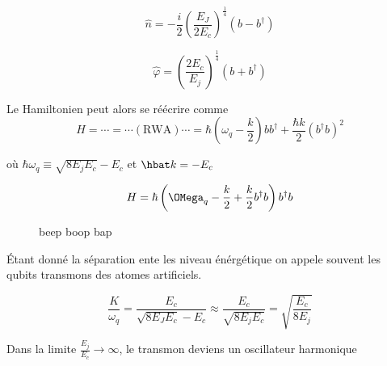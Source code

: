\[ \hat n = - \frac{i}{2} \left( \frac{E_J}{2E_c}  \right)^{\frac{1}{4} } \left( b - b ^{\dagger} \right) \]


\[ \hat \varphi = \left( \frac{2E_c}{E_j}  \right)^{\frac{1}{4} }\left( b + b ^{\dagger} \right)  \]


Le Hamiltonien peut alors se réécrire comme \[ H = \dotsb = \dotsb(\text{RWA} ) \dotsb = \hbar \left( \omega_q - \frac{k}{2}  \right) b b^{\dagger} + \frac{\hbar{}k}{2} \left( b^{\dagger}b \right) ^2 \]

où $\hbar \omega_q \equiv \sqrt{8E_j E_{c}} - E_c $ et $\hbat k = -E_c $

\[ H = \hbar \left( \OMega_q - \frac{k}{2} + \frac{k}{2} b^{\dagger}b \right) b ^{\dagger} b  \]


\begin{figure}[ht]
    \centering
    \caption{beep boop bap}
    \label{fig:beep-boop-bap}
\end{figure}

Étant donné la séparation ente les niveau énérgétique on appele souvent les qubits transmons des atomes artificiels. 

\[ \frac{K}{\omega_q} = \frac{E_c}{\sqrt{8E_J{}E_c}-E_c} \approx \frac{E_c}{\sqrt{8E_j{}E_c}} = \sqrt{\frac{E_c}{8E_j} }  \]

Dans la limite $\frac{E_j}{E_c} \to \infty$, le  transmon deviens un oscillateur harmonique








